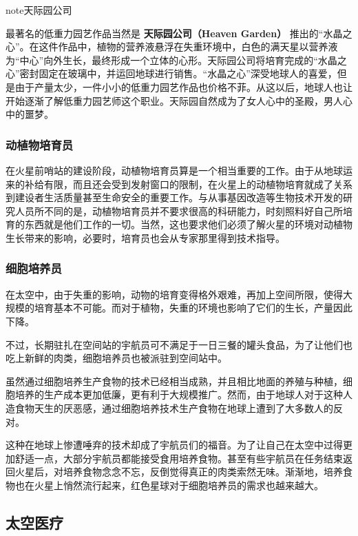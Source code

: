 \documentclass[letterpaper,10pt]{sphinxmanual}
\begin{document}
\begin{notice}{note}{天际园公司}

最著名的低重力园艺作品当然是 \textbf{天际园公司（Heaven Garden）} 推出的“水晶之心”。在这件作品中，植物的营养液悬浮在失重环境中，白色的满天星以营养液为“中心”向外生长，最终形成一个立体的心形。天际园公司将培育完成的“水晶之心”密封固定在玻璃中，并运回地球进行销售。“水晶之心”深受地球人的喜爱，但是由于产量太少，一件小小的低重力园艺作品也价格不菲。从这以后，地球人也让开始逐渐了解低重力园艺师这个职业。天际园自然成为了女人心中的圣殿，男人心中的噩梦。
\end{notice}


\subsubsection{动植物培育员}
\label{profession:id21}
在火星前哨站的建设阶段，动植物培育员算是一个相当重要的工作。由于从地球运来的补给有限，而且还会受到发射窗口的限制，在火星上的动植物培育就成了关系到建设者生活质量甚至生命安全的重要工作。与从事基因改造等生物技术开发的研究人员所不同的是，动植物培育员并不要求很高的科研能力，时刻照料好自己所培育的东西就是他们工作的一切。当然，这也要求他们必须了解火星的环境对动植物生长带来的影响，必要时，培育员也会从专家那里得到技术指导。


\subsubsection{细胞培养员}
\label{profession:id22}
在太空中，由于失重的影响，动物的培育变得格外艰难，再加上空间所限，使得大规模的培育基本不可能。而对于植物，失重的环境也影响了它们的生长，产量因此下降。

不过，长期驻扎在空间站的宇航员可不满足于一日三餐的罐头食品，为了让他们也吃上新鲜的肉类，细胞培养员也被派驻到空间站中。

虽然通过细胞培养生产食物的技术已经相当成熟，并且相比地面的养殖与种植，细胞培养的生产成本更加低廉，更有利于大规模推广。然而，由于地球人对于这种人造食物天生的厌恶感，通过细胞培养技术生产食物在地球上遭到了大多数人的反对。

这种在地球上惨遭唾弃的技术却成了宇航员们的福音。为了让自己在太空中过得更加舒适一点，大部分宇航员都能接受食用培养食物。甚至有些宇航员在任务结束返回火星后，对培养食物念念不忘，反倒觉得真正的肉类索然无味。渐渐地，培养食物也在火星上悄然流行起来，红色星球对于细胞培养员的需求也越来越大。


\subsection{太空医疗}
\label{profession:id23}
\end{document}
